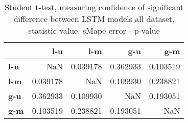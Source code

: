 \begin{table}[h]
\centering
\caption{Student t-test, measuring confidence of significant difference between LSTM models all dataset, statistic value. sMape error - p-value}
\label{table:ttest-p-values-lstm-experiments-sMAPE-all-dataset}
\begin{tabular}{lrrrr}
\toprule
{} &       l-u &       l-m &       g-u &       g-m \\
\midrule
\textbf{l-u} &       NaN &  0.039178 &  0.362933 &  0.103519 \\
\textbf{l-m} &  0.039178 &       NaN &  0.109930 &  0.238821 \\
\textbf{g-u} &  0.362933 &  0.109930 &       NaN &  0.193051 \\
\textbf{g-m} &  0.103519 &  0.238821 &  0.193051 &       NaN \\
\bottomrule
\end{tabular}
\end{table}
